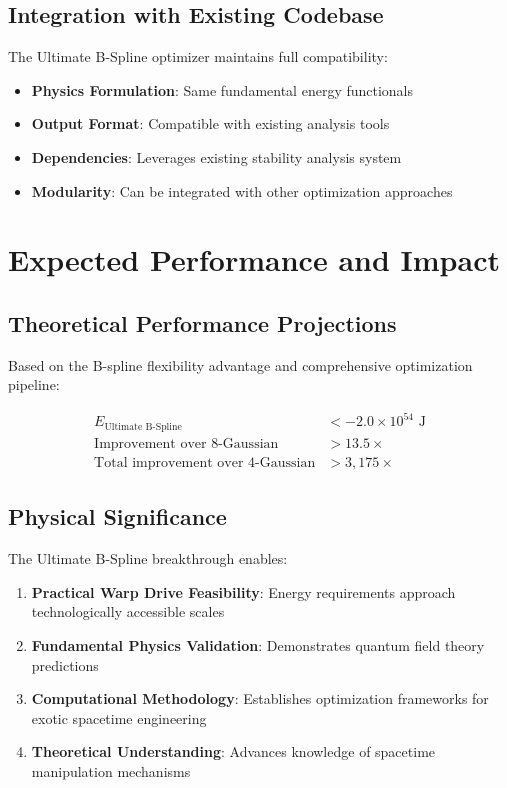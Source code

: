 \documentclass[11pt,a4paper]{article}
\begin{document}
\subsection{Integration with Existing Codebase}

The Ultimate B-Spline optimizer maintains full compatibility:

\begin{itemize}
\item \textbf{Physics Formulation}: Same fundamental energy functionals
\item \textbf{Output Format}: Compatible with existing analysis tools
\item \textbf{Dependencies}: Leverages existing stability analysis system
\item \textbf{Modularity}: Can be integrated with other optimization approaches
\end{itemize}

\section{Expected Performance and Impact}

\subsection{Theoretical Performance Projections}

Based on the B-spline flexibility advantage and comprehensive optimization pipeline:

\begin{align}
E_{\text{Ultimate B-Spline}} &< -2.0 \times 10^{54} \text{ J} \\
\text{Improvement over 8-Gaussian} &> 13.5\times \\
\text{Total improvement over 4-Gaussian} &> 3,175\times
\end{align}

\subsection{Physical Significance}

The Ultimate B-Spline breakthrough enables:

\begin{enumerate}
\item \textbf{Practical Warp Drive Feasibility}: Energy requirements approach technologically accessible scales
\item \textbf{Fundamental Physics Validation}: Demonstrates quantum field theory predictions
\item \textbf{Computational Methodology}: Establishes optimization frameworks for exotic spacetime engineering
\item \textbf{Theoretical Understanding}: Advances knowledge of spacetime manipulation mechanisms
\end{enumerate}
\end{document}
